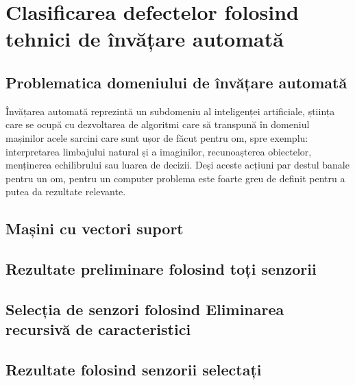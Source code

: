 \chapter{Clasificarea defectelor folosind tehnici de învățare automată}
\label{chap:ml_classification}


\section{Problematica domeniului de învățare automată}
Învățarea automată reprezintă un subdomeniu al inteligenței artificiale, știința care se ocupă cu dezvoltarea de algoritmi care să transpună în domeniul mașinilor acele sarcini care sunt ușor de făcut pentru om, spre exemplu: interpretarea limbajului natural și a imaginilor, recunoașterea obiectelor, menținerea echilibrului sau luarea de decizii. Deși aceste acțiuni par destul banale pentru un om, pentru un computer problema este foarte greu de definit pentru a putea da rezultate relevante.

\section{Mașini cu vectori suport}

\section{Rezultate preliminare folosind toți senzorii}

\section{Selecția de senzori folosind Eliminarea recursivă de caracteristici}

\section{Rezultate folosind senzorii selectați}